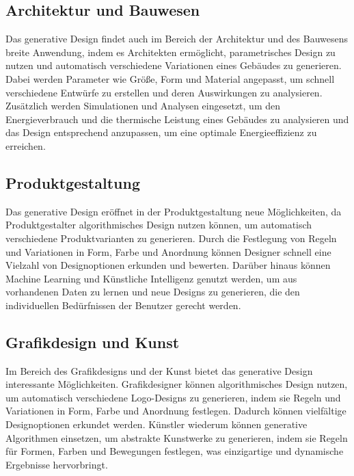 

\subsection{Architektur und Bauwesen}

Das generative Design findet auch im Bereich der Architektur und des Bauwesens breite Anwendung, indem es Architekten ermöglicht, parametrisches Design zu nutzen und automatisch verschiedene Variationen eines Gebäudes zu generieren. Dabei werden Parameter wie Größe, Form und Material angepasst, um schnell verschiedene Entwürfe zu erstellen und deren Auswirkungen zu analysieren. Zusätzlich werden Simulationen und Analysen eingesetzt, um den Energieverbrauch und die thermische Leistung eines Gebäudes zu analysieren und das Design entsprechend anzupassen, um eine optimale Energieeffizienz zu erreichen.

\subsection{Produktgestaltung}

Das generative Design eröffnet in der Produktgestaltung neue Möglichkeiten, da Produktgestalter algorithmisches Design nutzen können, um automatisch verschiedene Produktvarianten zu generieren. Durch die Festlegung von Regeln und Variationen in Form, Farbe und Anordnung können Designer schnell eine Vielzahl von Designoptionen erkunden und bewerten. Darüber hinaus können Machine Learning und Künstliche Intelligenz genutzt werden, um aus vorhandenen Daten zu lernen und neue Designs zu generieren, die den individuellen Bedürfnissen der Benutzer gerecht werden.

\subsection{Grafikdesign und Kunst}

Im Bereich des Grafikdesigns und der Kunst bietet das generative Design interessante Möglichkeiten. Grafikdesigner können algorithmisches Design nutzen, um automatisch verschiedene Logo-Designs zu generieren, indem sie Regeln und Variationen in Form, Farbe und Anordnung festlegen. Dadurch können vielfältige Designoptionen erkundet werden. Künstler wiederum können generative Algorithmen einsetzen, um abstrakte Kunstwerke zu generieren, indem sie Regeln für Formen, Farben und Bewegungen festlegen, was einzigartige und dynamische Ergebnisse hervorbringt.

